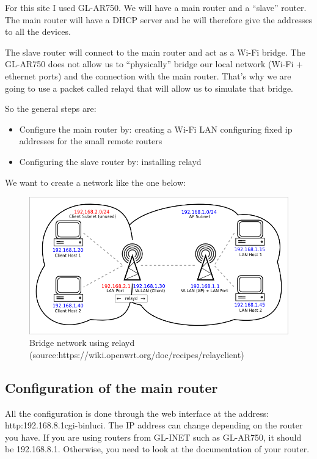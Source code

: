For this site I used GL-AR750. 
We will have a main router and a "`slave"' router.
The main router will have a DHCP server and he will therefore give the addresses to all the devices.

The slave router will connect to the main router and act as a Wi-Fi bridge. 
The GL-AR750 does not allow us to "`physically"' bridge our local network (Wi-Fi + ethernet ports) and the connection with the main router. That's why we are going to use a packet called relayd that will allow us to simulate that bridge.

So the general steps are:
\begin{itemize}
	\item Configure the main router by:
		\subitem creating a Wi-Fi LAN 
		\subitem configuring fixed ip addresses for the small remote routers
	\item Configuring the slave router by:
		\subitem installing relayd
\end{itemize} 

We want to create a network like the one below:
\begin{figure}[H]
\begin{center}
\includegraphics[width=\columnwidth]{image/802-11-routed-relay.png}%
\caption{Bridge network using relayd (source:https://wiki.openwrt.org/doc/recipes/relayclient)}%
\label{figure:interface3}%
\end{center}
\end{figure}


\subsection{Configuration of the main router}

All the configuration is done through the web interface at the address: http:\/\/192.168.8.1\/cgi-bin\/luci.
The IP address can change depending on the router you have. If you are using routers from GL-INET such as GL-AR750, it should be 192.168.8.1. Otherwise, you need to look at the documentation of your router.


